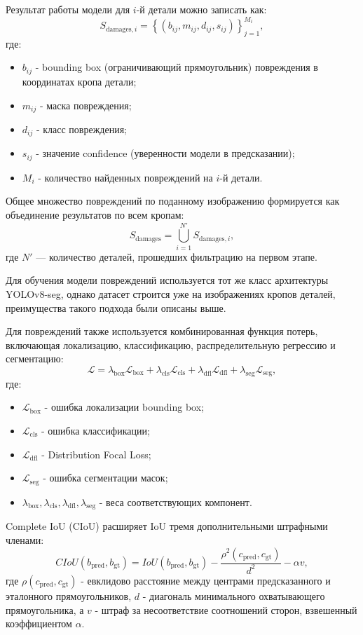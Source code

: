 Результат работы модели для $i$-й детали можно записать как:
\[
S_{\text{damages}, i} =
\left\{(b_{ij}, m_{ij}, d_{ij}, s_{ij})\right\}_{j=1}^{M_i},
\]
где:
\begin{itemize}
    \item $b_{ij}$ - bounding box (ограничивающий прямоугольник) повреждения в координатах кропа детали;
    \item $m_{ij}$ - маска повреждения;
    \item $d_{ij}$ - класс повреждения;
    \item $s_{ij}$ - значение confidence (уверенности модели в предсказании);
    \item $M_i$ - количество найденных повреждений на $i$-й детали.
\end{itemize}

Общее множество повреждений по поданному изображению формируется как объединение результатов по всем кропам:
\[
S_{\text{damages}} = \bigcup_{i=1}^{N'} S_{\text{damages}, i},
\]
где $N'$ --- количество деталей, прошедших фильтрацию на первом этапе.

Для обучения модели повреждений используется тот же класс архитектуры YOLOv8-seg, однако датасет строится уже на изображениях кропов деталей, преимущества такого подхода были описаны выше.

Для повреждений также используется комбинированная функция потерь, включающая локализацию, классификацию, распределительную регрессию и сегментацию:
\[
\mathcal{L} =
\lambda_{\text{box}}\mathcal{L}_{\text{box}} +
\lambda_{\text{cls}}\mathcal{L}_{\text{cls}} +
\lambda_{\text{dfl}}\mathcal{L}_{\text{dfl}} +
\lambda_{\text{seg}}\mathcal{L}_{\text{seg}},
\]
где:
\begin{itemize}
    \item $\mathcal{L}_{\text{box}}$ - ошибка локализации bounding box;
    \item $\mathcal{L}_{\text{cls}}$ - ошибка классификации;
    \item $\mathcal{L}_{\text{dfl}}$ - Distribution Focal Loss;
    \item $\mathcal{L}_{\text{seg}}$ - ошибка сегментации масок;
    \item $\lambda_{\text{box}}, \lambda_{\text{cls}}, \lambda_{\text{dfl}}, \lambda_{\text{seg}}$ - веса соответствующих компонент.
\end{itemize}

Complete IoU (CIoU) расширяет IoU тремя дополнительными штрафными членами:
\[
CIoU(b_{\text{pred}}, b_{\text{gt}}) = IoU(b_{\text{pred}}, b_{\text{gt}})
- \frac{\rho^2(c_{\text{pred}}, c_{\text{gt}})}{d^2}
- \alpha v,
\]
где $\rho(c_{\text{pred}}, c_{\text{gt}})$ - евклидово расстояние между центрами предсказанного и эталонного прямоугольников, $d$ - диагональ минимального охватывающего прямоугольника, а $v$ - штраф за несоответствие соотношений сторон, взвешенный коэффициентом $\alpha$.


